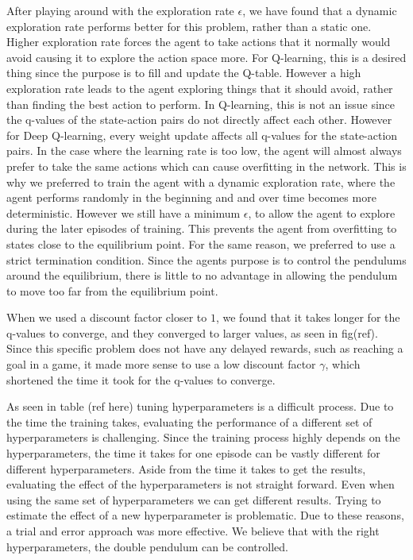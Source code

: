 \documentclass{LTHtwocol} %
\begin{document}
After playing around with the exploration rate $\epsilon$, we have found that a dynamic exploration rate performs better for this problem, rather than a static one.
Higher exploration rate forces the agent to take actions that it normally would avoid causing it to explore the action space more.
For Q-learning, this is a desired thing since the purpose is to fill and update the Q-table.
However a high exploration rate leads to the agent exploring things that it should avoid, rather than finding the best action to perform.
In Q-learning, this is not an issue since the q-values of the state-action pairs do not directly affect each other.
However for Deep Q-learning, every weight update affects all q-values for the state-action pairs.
In the case where the learning rate is too low, the agent will almost always prefer to take the same actions which can cause overfitting in the network.
This is why we preferred to train the agent with a dynamic exploration rate, where the agent performs randomly in the beginning and and over time becomes more deterministic.
However we still have a minimum $\epsilon$, to allow the agent to explore during the later episodes of training.
This prevents the agent from overfitting to states close to the equilibrium point.
For the same reason, we preferred to use a strict termination condition. 
Since the agents purpose is to control the pendulums around the equilibrium, there is little to no advantage in allowing the pendulum to move too far from the equilibrium point.

When we used a discount factor closer to $1$, we found that it takes longer for the q-values to converge, and they converged to larger values, as seen in fig(ref).
Since this specific problem does not have any delayed rewards, such as reaching a goal in a game, it made more sense to use a low discount factor $\gamma$, which shortened the time it took for the q-values to converge.

As seen in table (ref here) tuning hyperparameters is a difficult process. 
Due to the time the training takes, evaluating the performance of a different set of hyperparameters is challenging.
Since the training process highly depends on the hyperparameters, the time it takes for one episode can be vastly different for different hyperparameters.
Aside from the time it takes to get the results, evaluating the effect of the hyperparameters is not straight forward.
Even when using the same set of hyperparameters we can get different results.
Trying to estimate the effect of a new hyperparameter is problematic.
Due to these reasons, a trial and error approach was more effective.
We believe that with the right hyperparameters, the double pendulum can be controlled.
\end{document}

